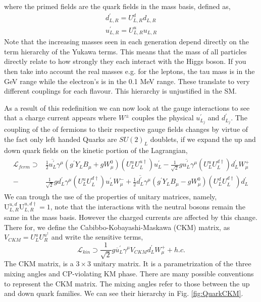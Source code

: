 %
where the primed fields are the quark fields in the mass basis, defined as, 
\begin{equation}
\begin{split}
d^\prime_{L,R} = U^d_{L,R} d_{L,R} \\
u^\prime_{L,R} = U^u_{L,R} u_{L,R} 
\end{split}  
\end{equation}
% 
Note that the increasing masses seen in each generation depend directly on the term hierarchy of the Yukawa terms. This means that the mass of all particles directly relate to how strongly they each interact with the Higgs boson.
%
If you then take into account the real masses e.g. for the leptons, the tau mass is in the GeV range while the electron's is in the 0.1 MeV range. These translate to very different couplings for each flavour. 
%
This hierarchy is unjustified in the SM. 

As a result of this redefinition we can now look at the gauge interactions to see that a charge current appears where $W^\pm$ couples the physical $u^\prime_{L_j}$ and $d^\prime_{L_j}$. 
%
The coupling of the of fermions to their respective gauge fields changes by virtue of the fact only left handed Quarks are $SU(2)_L$ doublets, if we expand the up and down quark fields on the kinetic portion of the Lagrangian,
%
\begin{align}
\label{LagFermFCCCs}
\begin{split}
\mathcal{L}_{ferm} \supset & 
\frac{1}{2} \overline{u^\prime_L} \gamma^\mu \left( g^\prime Y_L B_\mu + g W^0_\mu  \right) \left(U^u_L U^{u \dagger}_L \right) u^\prime_L - \frac{1}{\sqrt{2}} g \overline{u^\prime_L} \gamma^\mu \left( U^u_L U^{d \dagger}_L \right) d^\prime_L W^+_\mu \\ \nonumber   
- 
& \frac{1}{\sqrt{2}} g d^\prime_L \gamma^\mu \left( U^u_L U^{d \dagger}_L \right) u^\prime_L W^-_\mu 
+ 
\frac{1}{2} \overline{d^\prime_L} \gamma^\mu \left( g^\prime Y_L B_\mu - g W^0_\mu \right) \left( U^d_L U^{d \dagger}_L \right) d^\prime_L  
\end{split}
\end{align}
%
We can trough the use of the properties of unitary matrices, namely, $ \mathrm{U}^{u,d}_{L,R} \mathrm{U}^{u,d \dagger}_{L,R} = 1$, note that the interactions with the neutral bosons remain the same in the mass basis.
%
However the charged currents are affected by this change.
%
There for, we define the Cabibbo-Kobayashi-Maskawa (CKM) matrix, as $V_{CKM} = U^u_L U^{u ^\dagger }_R $ and write the sensitive terms,
%
\begin{equation}
\mathcal{L}_{kin} \supset \frac{1}{\sqrt{2}} g \overline{u}^\prime_L \gamma^\mu V_{CKM} d_L^\prime W^+_\mu + h.c. 
\end{equation}
%
The CKM matrix, is a $3 \times 3$ unitary matrix. It is a parametrization of the three mixing angles and CP-violating KM phase. There are many possible conventions to represent the CKM matrix.
%
The mixing angles refer to those between the up and down quark families. We can see their hierarchy in Fig. \ref{fig:QuarkCKM}.


